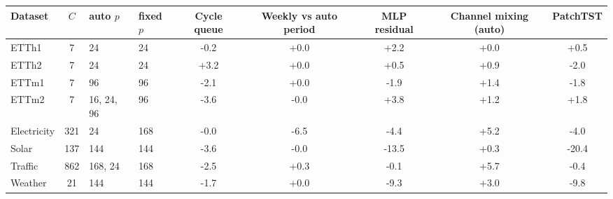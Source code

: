 \begin{tabular}{lcllccccc}
\toprule
Dataset & $C$ & auto $p$ & fixed $p$ & Cycle queue & Weekly vs auto period & MLP residual & Channel mixing (auto) & PatchTST \\
\midrule
ETTh1 & 7 & 24 & 24 & -0.2 & +0.0 & +2.2 & +0.0 & +0.5 \\
ETTh2 & 7 & 24 & 24 & +3.2 & +0.0 & +0.5 & +0.9 & -2.0 \\
ETTm1 & 7 & 96 & 96 & -2.1 & +0.0 & -1.9 & +1.4 & -1.8 \\
ETTm2 & 7 & 16, 24, 96 & 96 & -3.6 & -0.0 & +3.8 & +1.2 & +1.8 \\
Electricity & 321 & 24 & 168 & -0.0 & -6.5 & -4.4 & +5.2 & -4.0 \\
Solar & 137 & 144 & 144 & -3.6 & -0.0 & -13.5 & +0.3 & -20.4 \\
Traffic & 862 & 168, 24 & 168 & -2.5 & +0.3 & -0.1 & +5.7 & -0.4 \\
Weather & 21 & 144 & 144 & -1.7 & +0.0 & -9.3 & +3.0 & -9.8 \\
\bottomrule
\end{tabular}